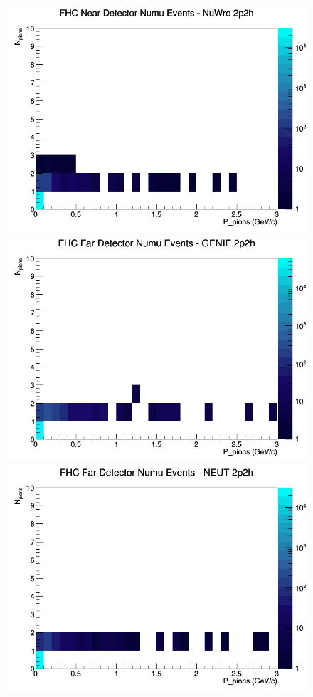\documentclass[12pt]{article}
\begin{document}
\begin{figure}[h]
\includegraphics[width=\linewidth]{N_P/nominal/pions/2p2h_FHC_ND_numu_N_P_NuWro.png}
\endminipage
\newline
{}
\includegraphics[width=\linewidth]{N_P/nominal/pions/2p2h_FHC_FD_numu_N_P_GENIE.png}
\endminipage
{}
\includegraphics[width=\linewidth]{N_P/nominal/pions/2p2h_FHC_FD_numu_N_P_NEUT.png}

\end{figure}
\end{document}
